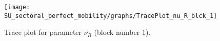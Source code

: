 \begin{figure}[H]
\centering
  \texttt{[image: SU\_sectoral\_perfect\_mobility/graphs/TracePlot\_nu\_R\_blck\_1]}\\
    \caption{Trace plot for parameter ${\nu_R}$ (block number 1).}
\end{figure}

